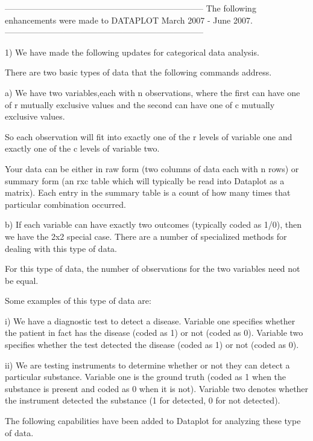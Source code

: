 {-----------------------------------------------------------------------
The following enhancements were made to DATAPLOT
March 2007 - June   2007.
-----------------------------------------------------------------------

 1) We have made the following updates for categorical data
    analysis.

    There are two basic types of data that the following
    commands address.

    a) We have two variables,each with n observations, where
       the first can have one of r mutually exclusive values
       and the second can have one of c mutually exclusive values.

       So each observation will fit into exactly one of the
       r levels of variable one and exactly one of the c levels
       of variable two.

       Your data can be either in raw form (two columns of data
       each with n rows) or summary form (an rxc table which
       will typically be read into Dataplot as a matrix).
       Each entry in the summary table is a count of how many
       times that particular combination occurred.

    b) If each variable can have exactly two outcomes (typically
       coded as 1/0), then we have the 2x2 special case.  There
       are a number of specialized methods for dealing with
       this type of data.

       For this type of data, the number of observations for
       the two variables need not be equal.

       Some examples of this type of data are:

        i) We have a diagnostic test to detect a disease.
           Variable one specifies whether the patient in
           fact has the disease (coded as 1) or not (coded
           as 0).  Variable two specifies whether the test
           detected the disease (coded as 1) or not (coded
           as 0).

       ii) We are testing instruments to determine whether or
           not they can detect a particular substance.  Variable
           one is the ground truth (coded as 1 when the substance
           is present and coded as 0 when it is not).  Variable
           two denotes whether the instrument detected the
           substance (1 for detected, 0 for not detected).

    The following capabilities have been added to Dataplot
    for analyzing these type of data.

}
